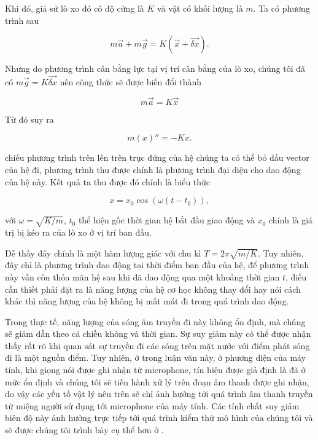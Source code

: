 		Khi đó, giả sử lò xo đó có độ cứng là $K$ và vật có khối lượng là $m$. Ta có phương trình sau
		
			\begin{equation}
				m\vec{a} + m\vec{g} = K (\vec{x} + \vec{\delta x}).
			\label{intro::harmonic_formula_0}
			\end{equation}
		
		Nhưng do phương trình cân bằng lực tại vị trí cân bằng của lò xo, chúng tôi đã có $m\vec{g} = K\vec{\delta x}$ nên công thức  sẽ được biến đổi thành
		
			\begin{equation*}
				m\vec{a} = K \vec{x}
			\end{equation*}
		
		Từ đó suy ra
		
			\begin{equation}
				m (x)'' = -K x.
				\label{intro::harmonic_formula_1}
			\end{equation}
		
		\noindent chiếu phương trình trên lên trên trục đứng của hệ chúng ta có thể bỏ dấu vector của hệ đi, phương trình thu được chính là phương trình đại diện cho dao động của hệ này. Kết quả ta thu được đó chính là biểu thức
		
			\begin{equation}
				x = x_0 \cos(\omega (t - t_0)),
				\label{intro::harmonic_formula_2}
			\end{equation}
		
		\noindent với $\omega = \sqrt{K/m}$, $t_0$ thể hiện gốc thời gian hệ bắt đầu giao động và $x_0$ chính là giá trị bị kéo ra của lò xo ở vị trí ban đầu. 
		
		Dễ thấy đây chính là một hàm lượng giác với chu kì $T = 2\pi\sqrt{m/K}$. Tuy nhiên, đây chỉ là phương trình dao động tại thời điểm ban đầu của hệ, để phương trình này vẫn còn thỏa mãn hệ sau khi đã dao động qua một khoảng thời gian $t$, điều cần thiết phải đặt ra là năng lượng của hệ cơ học không thay đổi hay nói cách khác thì năng lượng của hệ không bị mất mát đi trong quá trình dao động.
			
		Trong thực tế, năng lượng của sóng âm truyền đi này không ổn định, mà chúng sẽ giảm dần theo cả chiều không và thời gian. Sự suy giảm này có thể được nhận thấy rất rõ khi quan sát sự truyền đi các sóng trên mặt nước với điểm phát sóng đi là một nguồn điểm. Tuy nhiên, ở trong luận văn này, ở phương diện của máy tính, khi giọng nói được ghi nhận từ microphone, tín hiệu được giả định là đã ở mức ổn định và chúng tôi sẽ tiến hành xử lý trên đoạn âm thanh được ghi nhận, do vậy các yếu tố vật lý nêu trên sẽ chỉ ảnh hưởng tới quá trình âm thanh truyền từ miệng người sử dụng tới microphone của máy tính. Các tính chất suy giảm biên độ này ảnh hưởng trực tiếp tới quá trình kiểm thử mô hình của chúng tôi và sẽ được chúng tôi trình bày cụ thể hơn ở .
		
